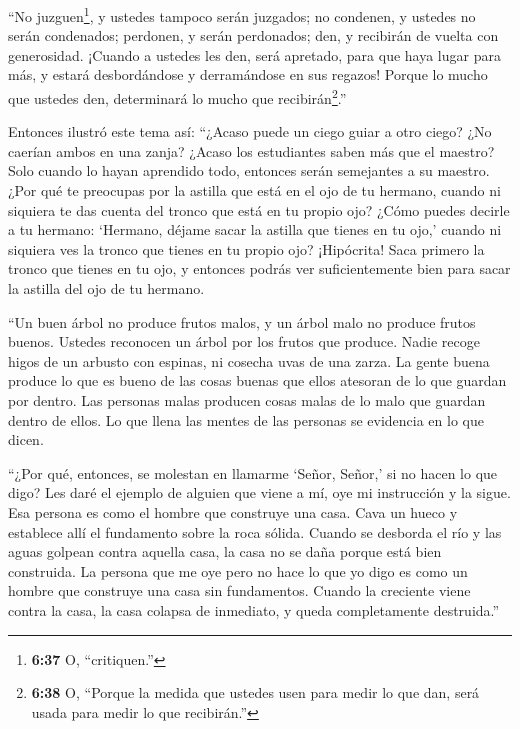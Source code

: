  ``No juzguen\footnote{\textbf{6:37} O, ``critiquen.''}, y
ustedes tampoco serán juzgados; no condenen, y ustedes no serán
condenados; perdonen, y serán perdonados;  den, y recibirán
de vuelta con generosidad. ¡Cuando a ustedes les den, será apretado,
para que haya lugar para más, y estará desbordándose y derramándose en
sus regazos! Porque lo mucho que ustedes den, determinará lo mucho que
recibirán\footnote{\textbf{6:38} O, ``Porque la medida que ustedes usen
  para medir lo que dan, será usada para medir lo que recibirán.''}.''

 Entonces ilustró este tema así: ``¿Acaso puede un ciego
guiar a otro ciego? ¿No caerían ambos en una zanja?  ¿Acaso
los estudiantes saben más que el maestro? Solo cuando lo hayan aprendido
todo, entonces serán semejantes a su maestro.  ¿Por qué te
preocupas por la astilla que está en el ojo de tu hermano, cuando ni
siquiera te das cuenta del tronco que está en tu propio ojo?
 ¿Cómo puedes decirle a tu hermano: `Hermano, déjame sacar
la astilla que tienes en tu ojo,' cuando ni siquiera ves la tronco que
tienes en tu propio ojo? ¡Hipócrita! Saca primero la tronco que tienes
en tu ojo, y entonces podrás ver suficientemente bien para sacar la
astilla del ojo de tu hermano.

 ``Un buen árbol no produce frutos malos, y un árbol malo
no produce frutos buenos.  Ustedes reconocen un árbol por
los frutos que produce. Nadie recoge higos de un arbusto con espinas, ni
cosecha uvas de una zarza.  La gente buena produce lo que
es bueno de las cosas buenas que ellos atesoran de lo que guardan por
dentro. Las personas malas producen cosas malas de lo malo que guardan
dentro de ellos. Lo que llena las mentes de las personas se evidencia en
lo que dicen.

 ``¿Por qué, entonces, se molestan en llamarme `Señor,
Señor,' si no hacen lo que digo?  Les daré el ejemplo de
alguien que viene a mí, oye mi instrucción y la sigue.  Esa
persona es como el hombre que construye una casa. Cava un hueco y
establece allí el fundamento sobre la roca sólida. Cuando se desborda el
río y las aguas golpean contra aquella casa, la casa no se daña porque
está bien construida.  La persona que me oye pero no hace
lo que yo digo es como un hombre que construye una casa sin fundamentos.
Cuando la creciente viene contra la casa, la casa colapsa de inmediato,
y queda completamente destruida.''

